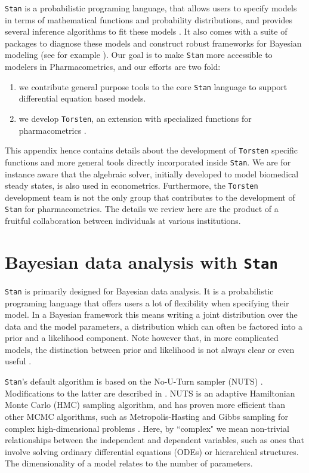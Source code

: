 \documentclass[11pt]{article}
\begin{document}
  \texttt{Stan} is a probabilistic programing language, that allows users to specify models
  in terms of mathematical functions and probability distributions,
  and provides several inference algorithms to fit these models \cite{Stan:2017}.
  It also comes with a suite of packages to diagnose these models
  and construct robust frameworks for Bayesian modeling (see for example
  \cite{Gabry:2017}).
  Our goal is to make \texttt{Stan} more accessible to modelers in Pharmacometrics,
  and our efforts are two fold:
  \begin{enumerate}
    \item we contribute general purpose tools to the core \texttt{Stan} language to support
    differential equation based models.
    \item we develop \texttt{Torsten}, an extension with specialized functions for pharmacometrics
    \cite{Gillespie:2018, Margossian:2016}.
  \end{enumerate}
  
  This appendix hence contains details about the development of \texttt{Torsten} specific functions
  and more general tools directly incorporated inside \texttt{Stan}.
  We are for instance aware that the algebraic solver, initially developed to model biomedical steady
  states, is also used in econometrics.
  Furthermore, the \texttt{Torsten} development team is not the only group that contributes to the development of
  \texttt{Stan} for pharmacometrics. The details we review here are the product of a fruitful collaboration
  between individuals at various institutions.
  
  \section{Bayesian data analysis with \texttt{Stan}}
  
  \texttt{Stan} is primarily designed for Bayesian data analysis.
  It is a probabilistic programing language that offers users a lot of flexibility
  when specifying their model. In a Bayesian framework this means writing
  a joint distribution over the data and the model parameters,
  a distribution which can often be factored into a prior and a likelihood component.
  Note however that, in more complicated models, the distinction between prior and likelihood
  is not always clear or even useful \cite{Gelman:2017}.

  \texttt{Stan}'s default algorithm is based on the No-U-Turn sampler
  (NUTS) \cite{Hoffman:2014}. Modifications to the latter are described in \cite{Betancourt:2017}.
  NUTS is an adaptive Hamiltonian Monte Carlo (HMC) sampling algorithm,
  and has proven more efficient than other MCMC algorithms,
  such as Metropolis-Hasting and Gibbs sampling for complex high-dimensional problems
  \cite{Hoffman:2014}.
  Here, by ``complex" we mean non-trivial relationships between the independent and dependent
  variables, such as ones that involve solving ordinary differential equations (ODEs) or hierarchical structures. 
  The dimensionality of a model relates to the number of parameters.
  
\end{document}
